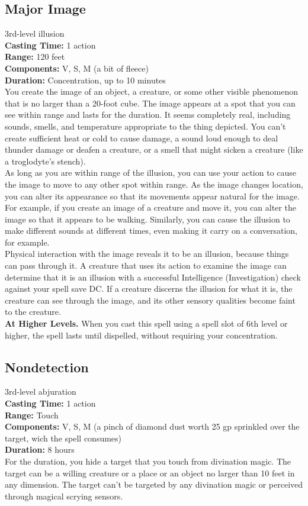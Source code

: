 \documentclass[11pt, A4paper, english]{article}
\begin{document}
		\subsection{Major Image}
3rd-level illusion \\
\textbf{Casting Time:} 1 action \\
\textbf{Range:} 120 feet \\
\textbf{Components:} V, S, M (a bit of fleece) \\
\textbf{Duration:} Concentration, up to 10 minutes \\
You create the image of an object, a creature, or some other visible phenomenon that is no larger than a 20-foot cube. The image appears at a spot that you can see within range and lasts for the duration. It seems completely real, including sounds, smells, and temperature appropriate to the thing depicted. You can’t create sufficient heat or cold to cause damage, a sound loud enough to deal thunder damage or deafen a creature, or a smell that might sicken a creature (like a troglodyte’s stench). \\
As long as you are within range of the illusion, you can use your action to cause the image to move to any other spot within range. As the image changes location, you can alter its appearance so that its movements appear natural for the image. For example, if you create an image of a creature and move it, you can alter the image so that it appears to be walking. Similarly, you can cause the illusion to make different sounds at different times, even making it carry on a conversation, for example. \\
Physical interaction with the image reveals it to be an illusion, because things can pass through it. A creature that uses its action to examine the image can determine that it is an illusion with a successful Intelligence (Investigation) check against your spell save DC. If a creature discerns the illusion for what it is, the creature can see through the image, and its other sensory qualities become faint to the creature. \\
\textbf{At Higher Levels.} When you cast this spell using a spell slot of 6th level or higher, the spell lasts until dispelled, without requiring your concentration.

		\subsection{Nondetection}
3rd-level abjuration \\
\textbf{Casting Time:} 1 action \\
\textbf{Range:} Touch \\
\textbf{Components:} V, S, M (a pinch of diamond dust worth 25 gp sprinkled over the target, wich the spell consumes) \\
\textbf{Duration:} 8 hours \\
For the duration, you hide a target that you touch from divination magic. The target can be a willing creature or a place or an object no larger than 10 feet in any dimension. The target can’t be targeted by any divination magic or perceived through magical scrying sensors.
\end{document}
